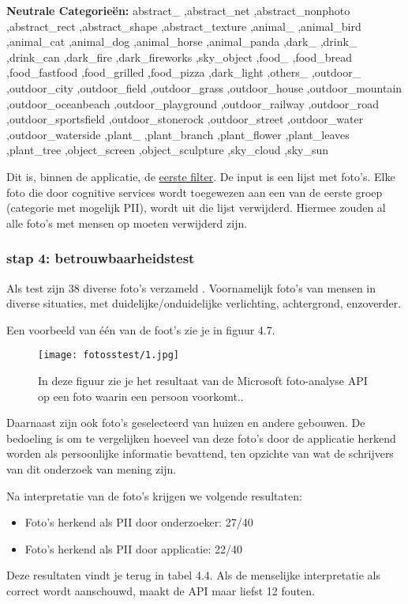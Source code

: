 \textbf{Neutrale Categorieën:} abstract\_
,abstract\_net
,abstract\_nonphoto
,abstract\_rect
,abstract\_shape
,abstract\_texture
,animal\_
,animal\_bird
,animal\_cat
,animal\_dog
,animal\_horse
,animal\_panda
,dark\_
,drink\_
,drink\_can
,dark\_fire
,dark\_fireworks
,sky\_object
,food\_
,food\_bread
,food\_fastfood
,food\_grilled
,food\_pizza
,dark\_light
,others\_
,outdoor\_
,outdoor\_city
,outdoor\_field
,outdoor\_grass
,outdoor\_house
,outdoor\_mountain
,outdoor\_oceanbeach
,outdoor\_playground
,outdoor\_railway
,outdoor\_road
,outdoor\_sportsfield
,outdoor\_stonerock
,outdoor\_street
,outdoor\_water
,outdoor\_waterside
,plant\_
,plant\_branch
,plant\_flower
,plant\_leaves
,plant\_tree
,object\_screen
,object\_sculpture
,sky\_cloud
,sky\_sun

Dit is, binnen de applicatie, de \underline{eerste filter}. De input is een lijst met foto's.
Elke foto die door cognitive services wordt toegewezen aan een  van de eerste groep (categorie met mogelijk PII), wordt uit die lijst verwijderd. Hiermee zouden al alle foto's met mensen op moeten verwijderd zijn.

\subsubsection{stap 4: betrouwbaarheidstest}
Als test zijn 38 diverse foto's verzameld \textcite{Adobe2019}. Voornamelijk foto's van mensen in diverse situaties, met duidelijke/onduidelijke verlichting, achtergrond, enzoverder. 

Een voorbeeld van één van de foot's zie je in figuur 4.7.
\begin{figure}[h]
    \texttt{[image: fotosstest/1.jpg]}
    \caption{In deze figuur zie je het resultaat van de Microsoft foto-analyse API op een foto waarin een persoon voorkomt..}
    \label{fig:fotopersoon}
\end{figure}
Daarnaast zijn ook foto's geselecteerd van huizen en andere gebouwen. De bedoeling is om te vergelijken hoeveel van deze foto's door de applicatie herkend worden als persoonlijke informatie bevattend, ten opzichte van wat de schrijvers van dit onderzoek van mening zijn. 


Na interpretatie van de foto's krijgen we volgende resultaten: 
\begin{itemize}
	\item Foto's herkend als PII door onderzoeker: 27/40
	\item Foto's herkend als PII door applicatie: 22/40
\end{itemize}
Deze resultaten vindt je terug in tabel 4.4. Als de menselijke interpretatie als correct wordt aanschouwd, maakt de API maar liefst 12 fouten.  

